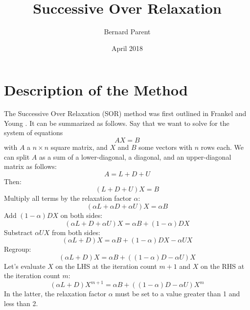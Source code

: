 \documentclass{warpdoc}
\author{
  Bernard Parent
}
\title{
  Successive Over Relaxation
}
\date{
  April 2018
}
\begin{document}
  \pagestyle{headings}
  \setcounter{page}{1}
  \makewarpdoctitle
\sloppy

\section{Description of the Method}

The Successive Over Relaxation (SOR) method was first outlined in Frankel \cite{moc:1950:frankel} and Young \cite{thesis:1950:young}. It can be summarized as follows.
Say that we want to solve for the system of equations
%
\begin{equation}
A X = B
\end{equation}
%
with $A$ a $n\times n$ square matrix, and $X$ and $B$ some vectors with $n$ rows each. We can split $A$ as a sum of a lower-diagonal, a diagonal, and an upper-diagonal matrix as follows:
%
\begin{equation}
A=L+D+U
\end{equation}
% 
Then:
%
\begin{equation}
(L+D+U) X = B
\end{equation}
%
Multiply all terms by the relaxation factor $\alpha$:
%
\begin{equation}
(\alpha L+\alpha D+ \alpha U) X = \alpha B
\end{equation}
%
Add $(1-\alpha)DX$ on both sides:
%
\begin{equation}
(\alpha L+ D+ \alpha U) X = \alpha B + (1-\alpha)DX
\end{equation}
%
Substract $\alpha U X$ from both sides:
%
\begin{equation}
(\alpha L+ D) X = \alpha B + (1-\alpha)DX- \alpha UX
\end{equation}
%
Regroup:
%
\begin{equation}
(\alpha L+ D) X = \alpha B + \left((1-\alpha)D - \alpha U \right)X
\end{equation}
%
Let's evaluate $X$ on the LHS at the iteration count $m+1$ and $X$ on the RHS at the iteration count $m$:
%
\begin{equation}
(\alpha L+ D) X^{m+1} = \alpha B + \left((1-\alpha)D - \alpha U \right)X^m
\end{equation}
%
In the latter, the relaxation factor $\alpha$ must be set to a value greater than 1 and less than 2.
\end{document}
